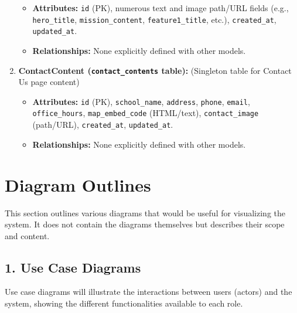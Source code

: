 \begin{enumerate}
\begin{itemize}
        \item \textbf{Attributes:} \texttt{id} (PK), numerous text and image path/URL fields (e.g., \texttt{hero\_title}, \texttt{mission\_content}, \texttt{feature1\_title}, etc.), \texttt{created\_at}, \texttt{updated\_at}.
        \item \textbf{Relationships:} None explicitly defined with other models.
    \end{itemize}
    \item \textbf{ContactContent (\texttt{contact\_contents} table):} (Singleton table for Contact Us page content)
    \begin{itemize}
        \item \textbf{Attributes:} \texttt{id} (PK), \texttt{school\_name}, \texttt{address}, \texttt{phone}, \texttt{email}, \texttt{office\_hours}, \texttt{map\_embed\_code} (HTML/text), \texttt{contact\_image} (path/URL), \texttt{created\_at}, \texttt{updated\_at}.
        \item \textbf{Relationships:} None explicitly defined with other models.
    \end{itemize}
\end{enumerate}

\section*{Diagram Outlines}

This section outlines various diagrams that would be useful for visualizing the system. It does not contain the diagrams themselves but describes their scope and content.

\subsection*{1. Use Case Diagrams}

Use case diagrams will illustrate the interactions between users (actors) and the system, showing the different functionalities available to each role.

